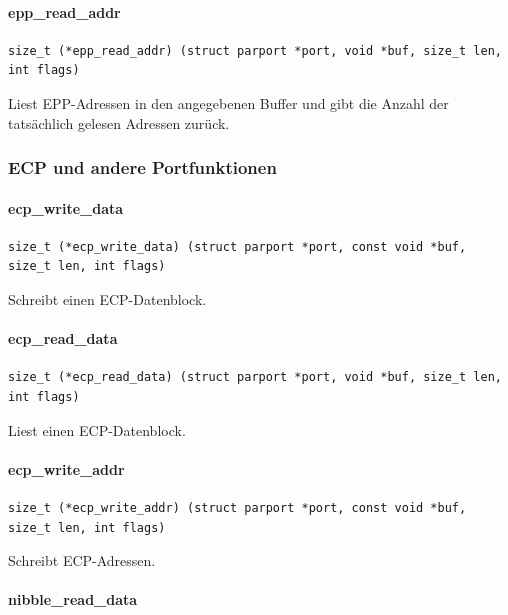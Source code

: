 \documentclass[a4paper,11pt]{article}
\begin{document}
\paragraph{epp\_read\_addr}
\begin{verbatim}
size_t (*epp_read_addr) (struct parport *port, void *buf, size_t len, int flags)
\end{verbatim}

Liest EPP-Adressen in den angegebenen Buffer und gibt die Anzahl der tatsächlich gelesen 
Adressen zurück.

\subsubsection{ECP und andere Portfunktionen}

\paragraph{ecp\_write\_data}
\begin{verbatim}
size_t (*ecp_write_data) (struct parport *port, const void *buf, size_t len, int flags)
\end{verbatim}

Schreibt einen ECP-Datenblock.


\paragraph{ecp\_read\_data}

\begin{verbatim}
size_t (*ecp_read_data) (struct parport *port, void *buf, size_t len, int flags)
\end{verbatim}

Liest einen ECP-Datenblock.


\paragraph{ecp\_write\_addr}

\begin{verbatim}
size_t (*ecp_write_addr) (struct parport *port, const void *buf, size_t len, int flags)
\end{verbatim}

Schreibt ECP-Adressen.


\paragraph{nibble\_read\_data}
\end{document}
